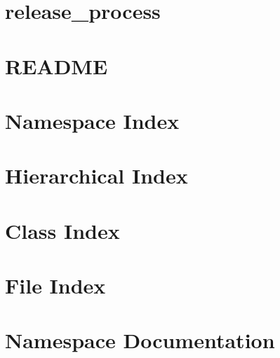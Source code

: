\let\mypdfximage\pdfximage\def\pdfximage{\immediate\mypdfximage}\documentclass[twoside]{book}
\newcommand{\+}{\discretionary{\mbox{\scriptsize$\hookleftarrow$}}{}{}}
\begin{document}
\chapter{release\+\_\+process}
\label{md_external_doctest_scripts_release_process}

\chapter{R\+E\+A\+D\+ME}
\label{md__r_e_a_d_m_e}

\chapter{Namespace Index}

\chapter{Hierarchical Index}

\chapter{Class Index}

\chapter{File Index}

\chapter{Namespace Documentation}

\end{document}
